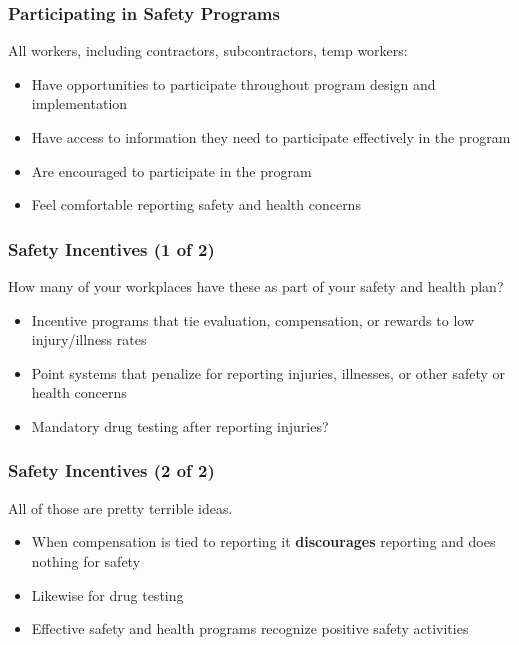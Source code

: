 \begin{frame}
    \frametitle{Participating in Safety Programs}

    All workers, including contractors, subcontractors, temp workers:
    \begin{itemize}[<+- | alert@+>]
        \item Have opportunities to participate throughout program design and implementation
        \item Have access to information they need to participate effectively in the program
        \item Are encouraged to participate in the program
        \item Feel comfortable reporting safety and health concerns
    \end{itemize}
\end{frame}

\begin{frame}
	\frametitle{Safety Incentives (1 of 2)}
    How many of your workplaces have these as part of your safety and health plan?
    \begin{itemize}[<+- | alert@+>]
        \item Incentive programs that tie evaluation, compensation, or rewards to low injury/illness rates
        \item Point systems that penalize for reporting injuries, illnesses, or other safety or health concerns
        \item Mandatory drug testing after reporting injuries?
    \end{itemize}
\end{frame}

\begin{frame}
	\frametitle{Safety Incentives (2 of 2)}
    All of those are pretty terrible ideas.
    \begin{itemize}[<+- | alert@+>]
        \item When compensation is tied to reporting it \textbf{discourages} reporting and does nothing for safety
        \item Likewise for drug testing 
        \item Effective safety and health programs recognize positive safety activities
    \end{itemize}
\end{frame}

